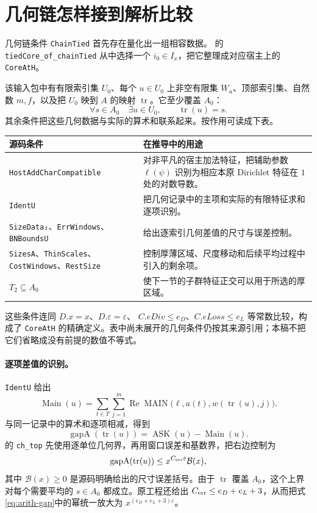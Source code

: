 \documentclass[UTF8,fontset=fandol,a4paper,openany,oneside]{ctexbook}
\theoremstyle{definition}
\theoremstyle{remark}
\newcommand{\Rea}{\operatorname{Re}}
\begin{document}
\section{几何链怎样接到解析比较}
\label{sec:arith-coreath}
几何链条件 \texttt{ChainTied} 首先存在量化出一组相容数据。 的 \texttt{tiedCore\_of\_chainTied} 从中选择一个 $i_0\in I_x$，把它整理成对应宿主上的 \texttt{CoreAtH}。

该输入包中有有限索引集 $U_0$、每个 $u\in U_0$ 上非空有限集 $W_u$、顶部索引集、自然数 $m,f$，以及把 $U_0$ 映到 $A$ 的映射 $\operatorname{tr}$。它至少覆盖 $A_0$：
\[
\forall s\in A_0\quad\exists u\in U_0,
\qquad\operatorname{tr}(u)=s.
\]
其余条件把这些几何数据与实际的算术和联系起来。按作用可读成下表。

\begin{longtable}{@{}p{}p{}@{}}
\toprule
源码条件 & 在推导中的用途\\
\midrule
\endhead
\texttt{HostAddCharCompatible} & 对非平凡的宿主加法特征，把辅助参数 $\ell(\psi)$ 识别为相应本原 Dirichlet 特征在 $1$ 处的对数导数。\\
\texttt{IdentU} & 把几何记录中的主项和实际的有限特征求和逐项识别。\\
\texttt{SizeData₂}、\texttt{ErrWindows}、\texttt{BNBoundsU} & 给出逐索引几何差值的尺寸与误差控制。\\
\texttt{SizesA}、\texttt{ThinScales}、\texttt{CostWindows}、\texttt{RestSize} & 控制厚薄区域、尺度移动和后续平均过程中引入的剩余项。\\
$T_2\subseteq A_0$ & 使下一节的子群特征正交可以用于所选的厚区域。\\
\bottomrule
\end{longtable}

这些条件连同 $D.x=x$、$D.\varepsilon=\varepsilon$、
$C.eDiv\le e_D$、$C.eLoss\le e_L$ 等常数比较，构成了 \texttt{CoreAtH} 的精确定义。表中尚未展开的几何条件仍按其来源引用；本稿不把它们省略成没有前提的数值不等式。

\paragraph{逐项差值的识别。}
\texttt{IdentU} 给出
\[
\operatorname{Main}(u)
=\sum_{t\in T}\sum_{j=1}^{m}
\Rea\operatorname{MAIN}\bigl(\ell,a(t),w(\operatorname{tr}(u),j)\bigr).
\]
与同一记录中的算术和逐项相减，得到
\[
\operatorname{gapA}(\operatorname{tr}(u))
=\operatorname{ASK}(u)-\operatorname{Main}(u).
\]
 的 \texttt{ch\_top} 先使用逐单位几何界，再用窗口误差和基数界，把右边控制为
\begin{equation}
\operatorname{gapA}(\operatorname{tr}(u))
\le x^{C_{\rm err}\varepsilon}\mathcal B(x),
\label{eq:arith-gap}
\end{equation}
其中 $\mathcal B(x)\ge0$ 是源码明确给出的尺寸误差括号。由于 $\operatorname{tr}$ 覆盖 $A_0$，这个上界对每个需要平均的 $s\in A_0$ 都成立。原工程还给出
$C_{\rm err}\le e_D+e_L+3$，从而把式\eqref{eq:arith-gap}中的幂统一放大为 $x^{(e_D+e_L+3)\varepsilon}$。
\end{document}

